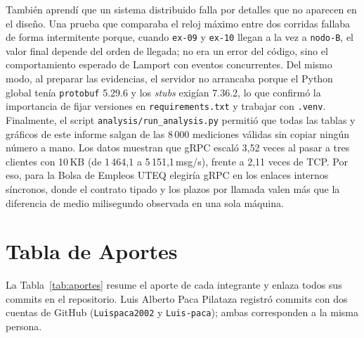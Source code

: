 \documentclass[12pt,a4paper]{article}
\begin{document}
También aprendí que un sistema distribuido falla por detalles que no aparecen en el diseño. Una prueba que comparaba el reloj máximo entre dos corridas fallaba de forma intermitente porque, cuando \texttt{ex-09} y \texttt{ex-10} llegan a la vez a \texttt{nodo-B}, el valor final depende del orden de llegada; no era un error del código, sino el comportamiento esperado de Lamport con eventos concurrentes. Del mismo modo, al preparar las evidencias, el servidor no arrancaba porque el Python global tenía \texttt{protobuf} 5.29.6 y los \emph{stubs} exigían 7.36.2, lo que confirmó la importancia de fijar versiones en \texttt{requirements.txt} y trabajar con \texttt{.venv}. Finalmente, el script \texttt{analysis/run\_analysis.py} permitió que todas las tablas y gráficos de este informe salgan de las 8\,000 mediciones válidas sin copiar ningún número a mano. Los datos muestran que gRPC escaló 3,52 veces al pasar a tres clientes con 10\,KB (de 1\,464,1 a 5\,151,1\,msg/s), frente a 2,11 veces de TCP. Por eso, para la Bolsa de Empleos UTEQ elegiría gRPC en los enlaces internos síncronos, donde el contrato tipado y los plazos por llamada valen más que la diferencia de medio milisegundo observada en una sola máquina.

\section{Tabla de Aportes}
\label{sec:aportes}

La Tabla~\ref{tab:aportes} resume el aporte de cada integrante y enlaza todos sus commits en el repositorio. Luis Alberto Paca Pilataza registró commits con dos cuentas de GitHub (\texttt{Luispaca2002} y \texttt{Luis-paca}); ambas corresponden a la misma persona.
\end{document}

